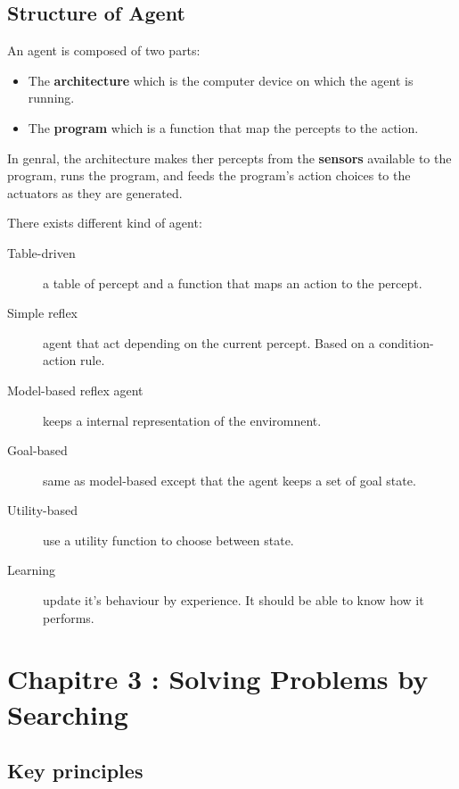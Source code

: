 \subsection{Structure of Agent}
An agent is composed of two parts:
\begin{itemize}
\item The \textbf{architecture} which is the computer device on which the agent is running.
\item The \textbf{program} which is a function that map the percepts to the action. 
\end{itemize}
In genral, the architecture makes ther percepts from the \textbf{sensors} available to the program, runs the 
program, and feeds the program's action choices to the actuators as they are generated.

There exists different kind of agent:
\begin{description}
\item[Table-driven] a table of percept and a function that maps an action to the percept.
\item[Simple reflex] agent that act depending on the current percept. Based on a condition-action 
rule.
\item[Model-based reflex agent] keeps a internal representation of the enviromnent.
\item[Goal-based] same as model-based except that the agent keeps a set of goal state.
\item[Utility-based] use a utility function to choose between state.
\item[Learning] update it's behaviour by experience. It should be able to know how it performs. 
\end{description}
\section{Chapitre 3 : Solving Problems by Searching}

\subsection{Key principles}

